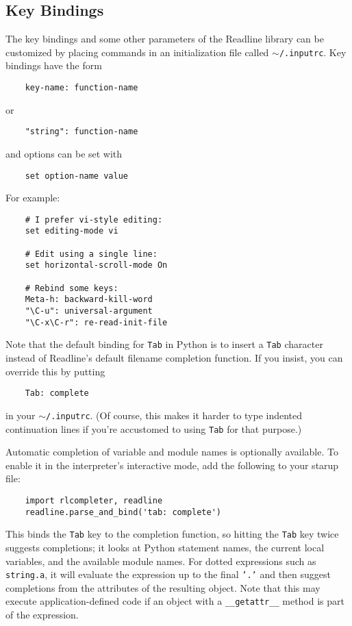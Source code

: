 \documentclass[UTF8]{article}
\begin{document}
\subsection{Key Bindings}
The key bindings and some other parameters of the Readline library can be customized by placing
commands in an initialization file called \texttt{$\sim$/.inputrc}. Key bindings have the form
\begin{verbatim}
    key-name: function-name
\end{verbatim}
or
\begin{verbatim}
    "string": function-name
\end{verbatim}
and options can be set with
\begin{verbatim}
    set option-name value
\end{verbatim}

For example:
\begin{verbatim}
    # I prefer vi-style editing:
    set editing-mode vi

    # Edit using a single line:
    set horizontal-scroll-mode On

    # Rebind some keys:
    Meta-h: backward-kill-word
    "\C-u": universal-argument
    "\C-x\C-r": re-read-init-file
\end{verbatim}

Note that the default binding for \texttt{Tab} in Python is to insert a \texttt{Tab} character
instead of Readline's default filename completion function. If you insist, you can override this by
putting
\begin{verbatim}
    Tab: complete
\end{verbatim}
in your \texttt{$\sim$/.inputrc}. (Of course, this makes it harder to type indented continuation
lines if you're accustomed to using \texttt{Tab} for that purpose.)

Automatic completion of variable and module names is optionally available. To enable it in the
interpreter's interactive mode, add the following to your starup file:
\begin{verbatim}
    import rlcompleter, readline
    readline.parse_and_bind('tab: complete')
\end{verbatim}
This binds the \texttt{Tab} key to the completion function, so hitting the \texttt{Tab} key twice
suggests completions; it looks at Python statement names, the current local variables, and the
available module names. For dotted expressions such as \texttt{string.a}, it will evaluate the
expression up to the final \texttt{'.'} and then suggest completions from the attributes of the
resulting object. Note that this may execute application-defined code if an object with a
\texttt{\_\_getattr\_\_} method is part of the expression.
\end{document}
